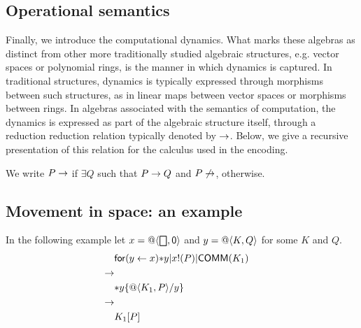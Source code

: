 \subsection{Operational semantics}

Finally, we introduce the computational dynamics. What marks these
algebras as distinct from other more traditionally studied algebraic
structures, e.g. vector spaces or polynomial rings, is the manner in
which dynamics is captured. In traditional structures, dynamics is typically
expressed through morphisms between such structures, as in linear maps
between vector spaces or morphisms between rings. In algebras
associated with the semantics of computation, the dynamics is
expressed as part of the algebraic structure itself, through a
reduction reduction relation typically denoted by $\red$. Below, we
give a recursive presentation of this relation for the calculus used
in the encoding.


We write $P\red$ if $\exists Q $ such that $ P \red Q$ and $P\not\red$, otherwise.

\subsection{ Movement in space: an example }
In the following example let $x = \spacen{\bigbox}{\pzero}$ and $y = \spacen{K}{Q}$ for some $K$ and $Q$.
\begin{eqnarray*}
  & \binpar{\binpar{\prefix{x}{y}{\dropn{y}}}{\outputp{x}{P}}}{\mathsf{COMM}(K_{1})} & \\
  \red & & \\
  & \dropn{y}\substn{\spacen{K_{1}}{P}}{y} & \\
  \red & & \\
  & K_{1}[P] &
\end{eqnarray*}


